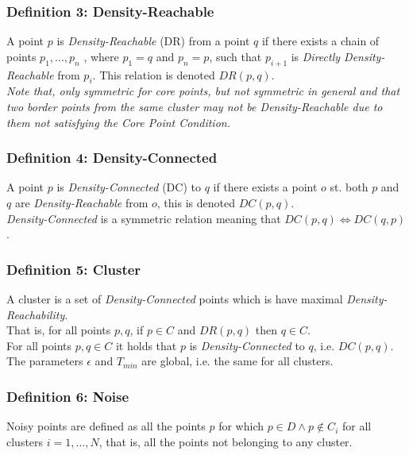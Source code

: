 \subsubsection*{Definition 3: Density-Reachable}
A point $p$ is \textit{Density-Reachable} (DR) from a point $q$ if
there exists a chain of points $p_1, ..., p_n$ , where $p_1 = q$ and $p_n = p$, such that $p_{i+1}$ is \textit{Directly Density-Reachable} from $p_i$.
This relation is denoted $DR(p,q)$.\\

\textit{Note that, only symmetric for core points, but not symmetric in general and that two border points from the same cluster may not be \textit{Density-Reachable} due to them not satisfying the Core Point Condition.}

\subsubsection*{Definition 4: Density-Connected}
A point $p$ is \textit{Density-Connected} (DC) to $q$ if there exists a point $o$ st. both $p$ and $q$ are \textit{Density-Reachable} from $o$, this is denoted $DC(p,q)$.\\

\textit{Density-Connected} is a symmetric relation meaning that $DC(p,q) \iff DC(q,p)$.

\subsubsection*{Definition 5: Cluster}
A cluster is a set of \textit{Density-Connected} points which is have maximal \textit{Density-Reachability}.\\

That is, for all points $p,q$, if $p \in C$ and $DR(p,q)$ then $q \in C$.\\

For all points $p,q \in C$ it holds that $p$ is \textit{Density-Connected} to $q$, i.e. $DC(p,q)$.\\

The parameters $\epsilon$ and $T_{min}$ are global, i.e. the same for all clusters.

\subsubsection*{Definition 6: Noise}
Noisy points are defined as all the points $p$ for which $p \in D \wedge p \notin C_i$ for all clusters $i = 1,...,N$, that is, all the points not belonging to any cluster.

